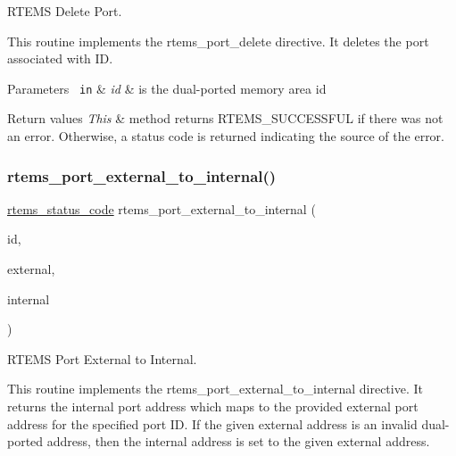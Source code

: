 R\+T\+E\+MS Delete Port. 

This routine implements the rtems\+\_\+port\+\_\+delete directive. It deletes the port associated with ID.


\begin{DoxyParams}[1]{Parameters}
\mbox{\texttt{ in}}  & {\em id} & is the dual-\/ported memory area id\\
\hline
\end{DoxyParams}

\begin{DoxyRetVals}{Return values}
{\em This} & method returns R\+T\+E\+M\+S\+\_\+\+S\+U\+C\+C\+E\+S\+S\+F\+UL if there was not an error. Otherwise, a status code is returned indicating the source of the error. \\
\hline
\end{DoxyRetVals}
\mbox{\label{group__ClassicDPMEM_gadd2893966bef2ba45246f76630583948}} 
\subsubsection{\texorpdfstring{rtems\_port\_external\_to\_internal()}{rtems\_port\_external\_to\_internal()}}
{\footnotesize\ttfamily \mbox{\hyperlink{group__ClassicStatus_ga545d41846817eaba6143d52ee4d9e9fe}{rtems\+\_\+status\+\_\+code}} rtems\+\_\+port\+\_\+external\+\_\+to\+\_\+internal (\begin{DoxyParamCaption}\item[{\mbox{\hyperlink{group__ClassicTasks_gab20892b814dced7dd4e5b9bf42becd57}{rtems\+\_\+id}}}]{id,  }\item[{void $\ast$}]{external,  }\item[{void $\ast$$\ast$}]{internal }\end{DoxyParamCaption})}



R\+T\+E\+MS Port External to Internal. 

This routine implements the rtems\+\_\+port\+\_\+external\+\_\+to\+\_\+internal directive. It returns the internal port address which maps to the provided external port address for the specified port ID. If the given external address is an invalid dual-\/ported address, then the internal address is set to the given external address.


